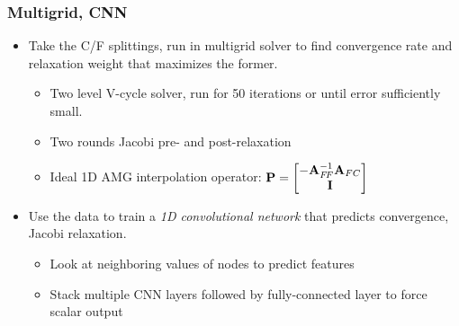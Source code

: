 \documentclass[handout]{beamer}
\renewcommand{\vec}[1]{ {\bf #1} }
\newcommand{\mat}[1]{ \vec{#1} }
\begin{document}
\begin{frame}
  \frametitle{Multigrid, CNN}
  \begin{itemize}
  \item Take the C/F splittings, run in multigrid solver to find convergence rate and relaxation weight that maximizes the former.
    \begin{itemize}
    \item Two level V-cycle solver, run for 50 iterations or until error sufficiently small.
    \item Two rounds Jacobi pre- and post-relaxation
    \item Ideal 1D AMG interpolation operator: $\mat{P} = \begin{bmatrix} -\mat{A}_{F\!F}^{-1}\mat{A}_{FC} \\ \mat{I} \end{bmatrix}$
    \end{itemize}
  \item Use the data to train a \textit{1D convolutional network} that predicts convergence, Jacobi relaxation.
    \begin{itemize}
    \item Look at neighboring values of nodes to predict features
    \item Stack multiple CNN layers followed by fully-connected layer to force scalar output
    \end{itemize}
  \end{itemize}
\end{frame}
\end{document}
